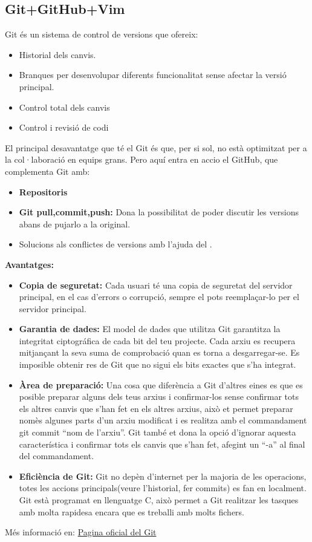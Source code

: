 \subsection{Git+GitHub+Vim}\label{subsec:Git+GitHub+Vim}
Git és un sistema de control de versions que ofereix:
\begin{itemize}
 \item Historial dels canvis.
 \item Branques per desenvolupar diferents funcionalitat sense afectar la versió principal.
 \item Control total dels canvis
 \item Control i revisió de codi
\end{itemize}
El principal desavantatge que té el Git és que, per si sol, no està optimitzat per a la col·laboració en equips grans. Pero aquí entra en accio el GitHub, que complementa Git amb:
\begin{itemize}
\item \textbf{Repositoris}
 \item \textbf{Git pull,commit,push:} Dona la possibilitat de poder discutir les versions abans de pujarlo a la original.
 \item Solucions als conflictes de versions amb l'ajuda del .
 \end{itemize}

\textbf{Avantatges:}

\begin{itemize}
 \item \textbf{Copia de seguretat:} Cada usuari té una copia de seguretat del servidor principal, en el cas d'errors o corrupció, sempre el pots reemplaçar-lo per el servidor principal.
 \item \textbf{Garantia de dades:} El model de dades que utilitza Git garantitza la integritat ciptográfica de cada bit del teu projecte. Cada arxiu es recupera mitjançant la seva suma de comprobació quan es torna a desgarregar-se. Es imposible obtenir res de Git que no sigui els bits exactes que s'ha integrat.
 \item \textbf{Àrea de preparació:} Una cosa que diferència a Git d'altres eines es que es posible preparar alguns dels teus arxius i confirmar-los sense confirmar tots els altres canvis que s'han fet en els altres arxius, això et permet preparar nomès algunes parts d'un arxiu modificat i es realitza amb el commandament git commit ``nom de l'arxiu''. Git també et dona la opció d'ignorar aquesta característica i confirmar tots els canvis que s'han fet, afegint un ``-a'' al final del commandament.
 \item \textbf{Eficiència de Git:} Git no depèn d'internet per la majoria de les operacions, totes les accions principals(veure l'historial, fer commits) es fan en localment. Git està programat en llenguatge C, això permet a Git realitzar les tasques amb molta rapidesa encara que es treballi amb molts fichers.
\end{itemize}
Més informació en: \href{https://git-scm.com/about/branching-and-merging}{Pagina oficial del Git}

